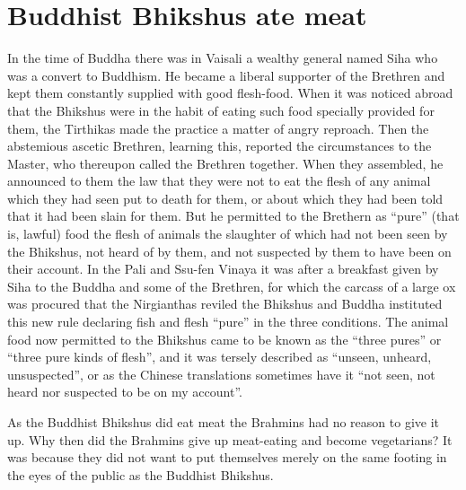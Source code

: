 \documentclass{article}
\begin{document}
\section{Buddhist Bhikshus ate meat}
\begin{shadequote}
In the time of Buddha there was in Vaisali a wealthy general named Siha who was a convert to Buddhism. He became a liberal supporter of the Brethren and kept them constantly supplied with good flesh-food. When it was noticed abroad that the Bhikshus were in the habit of eating such food specially provided for them, the Tirthikas made the practice a matter of angry reproach. Then the abstemious ascetic Brethren, learning this, reported the circumstances to the Master, who thereupon called the Brethren together. When they assembled, he announced to them the law that they were not to eat the flesh of any animal which they had seen put to death for them, or about which they had been told that it had been slain for them. But he permitted to the Brethern as ``pure'' (that is, lawful) food the flesh of animals the slaughter of which had not been seen by the Bhikshus, not heard of by them, and not suspected by them to have been on their account. In the Pali and Ssu-fen Vinaya it was after a breakfast given by Siha to the Buddha and some of the Brethren, for which the carcass of a large ox was procured that the Nirgianthas reviled the Bhikshus and Buddha instituted this new rule declaring fish and flesh ``pure'' in the three conditions. The animal food now permitted to the Bhikshus came to be known as the ``three pures'' or ``three pure kinds of flesh'', and it was tersely described as ``unseen, unheard, unsuspected'', or as the Chinese translations sometimes have it ``not seen, not heard nor suspected to be on my account''.

As the Buddhist Bhikshus did eat meat the Brahmins had no reason to give it up. Why then did the Brahmins give up meat-eating and become vegetarians? It was because they did not want to put themselves merely on the same footing in the eyes of the public as the Buddhist Bhikshus.
\end{shadequote}

\end{document}
